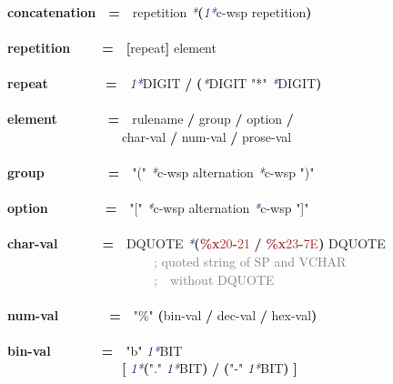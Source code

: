 \documentclass{article}
\begin{document}
{\\
\textbf{concatenation}\mbox{~~}\textbf{=}\mbox{~~}repetition \textcolor{MidnightBlue}{\emph{*}}\textbf{(}\textcolor{MidnightBlue}{\emph{1*}}c-wsp repetition\textbf{)}\\
\\
\textbf{repetition}\mbox{~~~~~}\textbf{=}\mbox{~~}\textbf{[}repeat\textbf{]} element\\
\\
\textbf{repeat}\mbox{~~~~~~~~~}\textbf{=}\mbox{~~}\textcolor{MidnightBlue}{\emph{1*}}DIGIT \textbf{/} \textbf{(}\textcolor{MidnightBlue}{\emph{*}}DIGIT \textcolor{BrickRed}{"*"} \textcolor{MidnightBlue}{\emph{*}}DIGIT\textbf{)}\\
\\
\textbf{element}\mbox{~~~~~~~~}\textbf{=}\mbox{~~}rulename \textbf{/} group \textbf{/} option \textbf{/}\\
\mbox{~~~~~~~~~~~~~~~~~~}char-val \textbf{/} num-val \textbf{/} prose-val\\
\\
\textbf{group}\mbox{~~~~~~~~~~}\textbf{=}\mbox{~~}\textcolor{BrickRed}{"("} \textcolor{MidnightBlue}{\emph{*}}c-wsp alternation \textcolor{MidnightBlue}{\emph{*}}c-wsp \textcolor{BrickRed}{")"}\\
\\
\textbf{option}\mbox{~~~~~~~~~}\textbf{=}\mbox{~~}\textcolor{BrickRed}{"["} \textcolor{MidnightBlue}{\emph{*}}c-wsp alternation \textcolor{MidnightBlue}{\emph{*}}c-wsp \textcolor{BrickRed}{"]"}\\
\\
\textbf{char-val}\mbox{~~~~~~~}\textbf{=}\mbox{~~}DQUOTE \textcolor{MidnightBlue}{\emph{*}}\textbf{(}\textcolor{Brown}{\textbf{\%{}x}20\textbf{-}21} \textbf{/} \textcolor{Brown}{\textbf{\%{}x}23\textbf{-}7E}\textbf{)} DQUOTE\\
\mbox{~~~~~~~~~~~~~~~~~~~~~~~}\textcolor{Gray}{; quoted string of SP and VCHAR}\\
\mbox{~~~~~~~~~~~~~~~~~~~~~~~}\textcolor{Gray}{;\mbox{~~}without DQUOTE}\\
\\
\textbf{num-val}\mbox{~~~~~~~~}\textbf{=}\mbox{~~}\textcolor{BrickRed}{"\%{}"} \textbf{(}bin-val \textbf{/} dec-val \textbf{/} hex-val\textbf{)}\\
\\
\textbf{bin-val}\mbox{~~~~~~~~}\textbf{=}\mbox{~~}\textcolor{BrickRed}{"b"} \textcolor{MidnightBlue}{\emph{1*}}BIT\\
\mbox{~~~~~~~~~~~~~~~~~~}\textbf{[} \textcolor{MidnightBlue}{\emph{1*}}\textbf{(}\textcolor{BrickRed}{"."} \textcolor{MidnightBlue}{\emph{1*}}BIT\textbf{)} \textbf{/} \textbf{(}\textcolor{BrickRed}{"-"} \textcolor{MidnightBlue}{\emph{1*}}BIT\textbf{)} \textbf{]}\\
}
\end{document}
